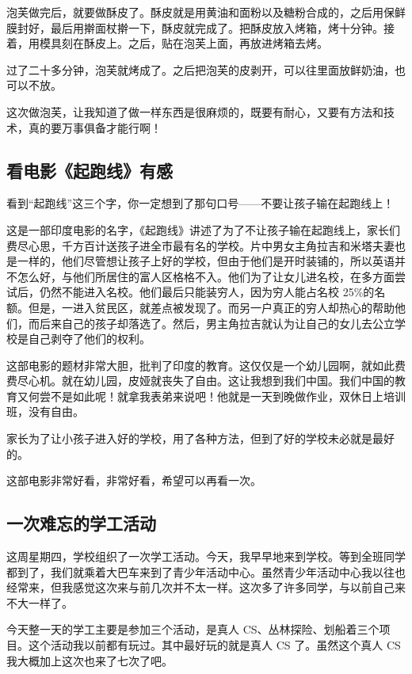 \documentclass[UTF8,a4paper,titlepage,twoside,10.5pt]{article}
\begin{document}
泡芙做完后，就要做酥皮了。酥皮就是用黄油和面粉以及糖粉合成的，之后用保鲜膜封好，最后用擀面杖擀一下，酥皮就完成了。把酥皮放入烤箱，烤十分钟。接着，用模具刻在酥皮上。之后，贴在泡芙上面，再放进烤箱去烤。

过了二十多分钟，泡芙就烤成了。之后把泡芙的皮剥开，可以往里面放鲜奶油，也可以不放。

这次做泡芙，让我知道了做一样东西是很麻烦的，既要有耐心，又要有方法和技术，真的要万事俱备才能行啊！

\subsection{看电影《起跑线》有感}
\label{sec:org43cc68d}

看到“起跑线”这三个字，你一定想到了那句口号——不要让孩子输在起跑线上！

这是一部印度电影的名字，《起跑线》讲述了为了不让孩子输在起跑线上，家长们费尽心思，千方百计送孩子进全市最有名的学校。片中男女主角拉吉和米塔夫妻也是一样的，他们尽管想让孩子上好的学校，但由于他们是开时装铺的，所以英语并不怎么好，与他们所居住的富人区格格不入。他们为了让女儿进名校，在多方面尝试后，仍然不能进入名校。他们最后只能装穷人，因为穷人能占名校 25\%的名额。但是，一进入贫民区，就差点被发现了。而另一户真正的穷人却热心的帮助他们，而后来自己的孩子却落选了。然后，男主角拉吉就认为让自己的女儿去公立学校是自己剥夺了他们的权利。

这部电影的题材非常大胆，批判了印度的教育。这仅仅是一个幼儿园啊，就如此费费尽心机。就在幼儿园，皮娅就丧失了自由。这让我想到我们中国。我们中国的教育又何尝不是如此呢！就拿我表弟来说吧！他就是一天到晚做作业，双休日上培训班，没有自由。

家长为了让小孩子进入好的学校，用了各种方法，但到了好的学校未必就是最好的。

这部电影非常好看，非常好看，希望可以再看一次。

\subsection{一次难忘的学工活动}
\label{sec:orgaa66c43}

这周星期四，学校组织了一次学工活动。今天，我早早地来到学校。等到全班同学都到了，我们就乘着大巴车来到了青少年活动中心。虽然青少年活动中心我以往也经常来，但我感觉这次来与前几次并不太一样。这次多了许多同学，与以前自己来不大一样了。

今天整一天的学工主要是参加三个活动，是真人 CS、丛林探险、划船着三个项目。这个活动我以前都有玩过。其中最好玩的就是真人 CS 了。虽然这个真人 CS 我大概加上这次也来了七次了吧。
\end{document}
